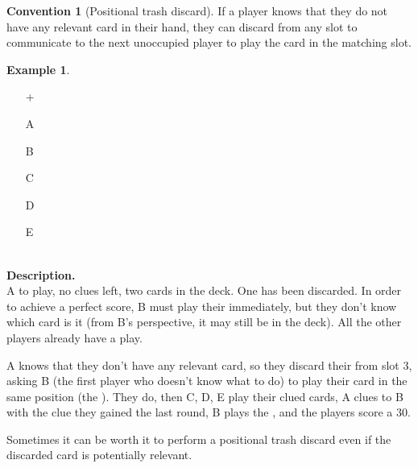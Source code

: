 \documentclass[a4paper]{article}
\theoremstyle{plain}
\theoremstyle{definition}
\newtheorem{example}[theorem]{Example}
\newtheorem{convention}[theorem]{Convention}
\begin{document}
\begin{convention}[Positional trash discard]
	If a player knows that they do not have any relevant card in their hand, they can discard from any slot to communicate to the next unoccupied player to play the card in the matching slot.
\end{convention}

\begin{example}	\hfill \\
	\begin{minipage}{0.45\textwidth}
		\begin{itemize}
			\item[\Large +]      
			\item[\Large A]    
			\item[\Large B]    
			\item[\Large C]    
			\item[\Large D]    
			\item[\Large E]    
		\end{itemize}
	\end{minipage}%
	\begin{minipage}{0.55\textwidth}
		\hfill \\
		
		\textbf{Description.} \\
		
		A to play, no clues left, two cards in the deck. One  has been discarded. In order to achieve a perfect score, B must play their  immediately, but they don't know which card is it (from B's perspective, it may still be in the deck). All the other players already have a play.
		
		A knows that they don't have any relevant card, so they discard their  from slot 3, asking B (the first player who doesn't know what to do) to play their card in the same position (the ). They do, then C, D, E play their clued cards, A clues  to B with the clue they gained the last round, B plays the , and the players score a 30.
	\end{minipage}
\end{example} \vspace{0.15 cm}

Sometimes it can be worth it to perform a positional trash discard even if the discarded card is potentially relevant.
\end{document}
